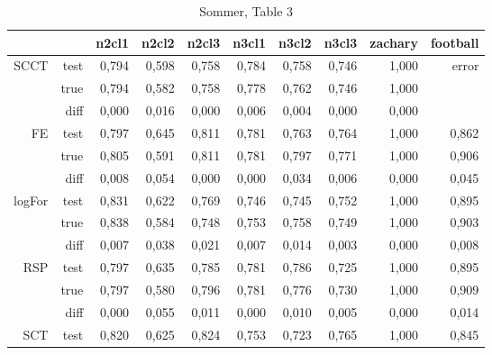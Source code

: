 \documentclass{article}
\begin{document}
\begin{table}[H]
\centering
\caption{Sommer, Table 3}
\label{my-label}
\begin{tabular}{rr|rrrrrrrr}
       &      & n2cl1 & n2cl2 & n2cl3 & n3cl1 & n3cl2 & n3cl3 & zachary & football \\
       \hline
SCCT   & test & 0,794        & 0,598        & 0,758        & 0,784        & 0,758        & 0,746        & 1,000   & \cellcolor{red!25} error    \\
       & true & 0,794        & 0,582        & 0,758        & 0,778        & 0,762        & 0,746        & 1,000   &          \\
       & diff & 0,000        & 0,016        & 0,000        & 0,006        & 0,004        & 0,000        & 0,000   &          \\
       \cline{2-10}
FE     & test & 0,797        & 0,645        & 0,811        & 0,781        & 0,763        & 0,764        & 1,000   & 0,862    \\
       & true & 0,805        & 0,591        & 0,811        & 0,781        & 0,797        & 0,771        & 1,000   & 0,906    \\
       & diff & 0,008        & 0,054        & 0,000        & 0,000        & 0,034        & 0,006        & 0,000   & 0,045    \\
       \cline{2-10}
logFor & test & 0,831        & 0,622        & 0,769        & 0,746        & 0,745        & 0,752        & 1,000   & 0,895    \\
       & true & 0,838        & 0,584        & 0,748        & 0,753        & 0,758        & 0,749        & 1,000   & 0,903    \\
       & diff & 0,007        & 0,038        & 0,021        & 0,007        & 0,014        & 0,003        & 0,000   & 0,008    \\
       \cline{2-10}
RSP    & test & 0,797        & 0,635        & 0,785        & 0,781        & 0,786        & 0,725        & 1,000   & 0,895    \\
       & true & 0,797        & 0,580        & 0,796        & 0,781        & 0,776        & 0,730        & 1,000   & 0,909    \\
       & diff & 0,000        & 0,055        & 0,011        & 0,000        & 0,010        & 0,005        & 0,000   & 0,014    \\
       \cline{2-10}
SCT    & test & 0,820        & 0,625        & 0,824        & 0,753        & 0,723        & 0,765        & 1,000   & 0,845    \\

\end{tabular}
\end{table}
\end{document}
